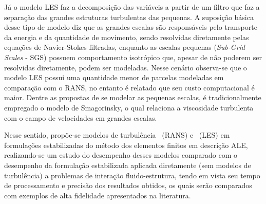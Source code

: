 Já o modelo LES faz a decomposição das variáveis a partir de um filtro que faz a separação das grandes estruturas turbulentas das pequenas. A suposição básica desse tipo de modelo diz que as grandes escalas são responsáveis pelo transporte da energia e da quantidade de movimento, sendo resolvidas diretamente pelas equações de Navier-Stokes filtradas, enquanto as escalas pequenas (\textit{Sub-Grid Scales} - SGS) possuem comportamento isotrópico que, apesar de não poderem ser resolvidas diretamente, podem ser modeladas. Nesse cenário observa-se que o modelo LES possui uma quantidade menor de parcelas modeladas em comparação com o RANS, no entanto é relatado que seu custo computacional é maior. Dentre as propostas de se modelar as pequenas escalas, é tradicionalmente empregado o modelo de Smagorinsky, o qual relaciona a viscosidade turbulenta com o campo de velocidades em grandes escalas.




Nesse sentido, propõe-se modelos de turbulência \RANS\ (RANS) e \LES\ (LES) em formulações estabilizadas do método dos elementos finitos em descrição ALE, realizando-se um estudo do desempenho desses modelos comparado com o desempenho da formulação estabilizada aplicada diretamente (sem modelos de turbulência) a problemas de interação fluido-estrutura, tendo em vista seu tempo de processamento e precisão dos resultados obtidos, os quais serão comparados com exemplos de alta fidelidade apresentados na literatura.


